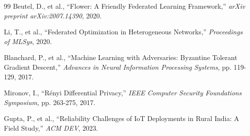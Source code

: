 \documentclass[conference,compsoc]{IEEEtran}
\begin{document}
\begin{thebibliography}{99}
Beutel, D., et al., ``Flower: A Friendly Federated Learning Framework,'' \textit{arXiv preprint arXiv:2007.14390}, 2020.

Li, T., et al., ``Federated Optimization in Heterogeneous Networks,'' \textit{Proceedings of MLSys}, 2020.

Blanchard, P., et al., ``Machine Learning with Adversaries: Byzantine Tolerant Gradient Descent,'' \textit{Advances in Neural Information Processing Systems}, pp. 119-129, 2017.

Mironov, I., ``Rényi Differential Privacy,'' \textit{IEEE Computer Security Foundations Symposium}, pp. 263-275, 2017.

Gupta, P., et al., ``Reliability Challenges of IoT Deployments in Rural India: A Field Study,'' \textit{ACM DEV}, 2023.

\end{thebibliography}
\end{document}
